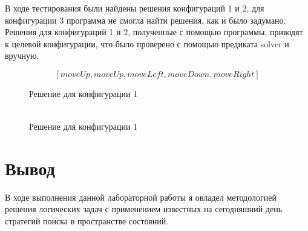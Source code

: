 \documentclass{article}
\begin{document}
В ходе тестирования были найдены решения конфигураций 1 и 2, для конфигурации 3 программа не смогла найти решения, как и было задумано. Решения для конфигураций 1 и 2, полученные с помощью программы, приводят к целевой конфигурации, что было проверено с помощью предиката solver и вручную.
\begin{figure}[H]
\[[moveUp, moveUp, moveLeft, moveDown, moveRight]\]
\caption{Решение для конфигурации 1}
\end{figure}
\begin{figure}[H]
  \begin{align*}
[moveDown, moveRight, moveUp, moveUp, moveRight, moveDown, moveDown,\\
  moveLeft, moveUp, moveRight, moveUp, moveLeft, moveLeft, moveDown,\\
  moveRight, moveRight, moveUp, moveLeft, moveLeft, moveDown,\\
  moveRight]
  \end{align*}
\caption{Решение для конфигурации 1}
\end{figure}

\section*{Вывод}
В ходе выполнения данной лабораторной работы я овладел методологией
решения логических задач с применением известных на сегодняшний день
стратегий поиска в пространстве состояний.
\end{document}
